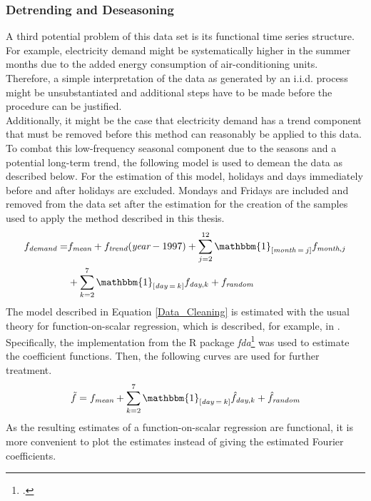 \documentclass[12pt, a4paper]{article}
\theoremstyle{MAstyle} \newtheorem{assumption}{Assumption}[section]
\theoremstyle{MAstyle} \newtheorem{definition}{Definition}[section]
\theoremstyle{MAstyle} \newtheorem{theorem}{Theorem}[section]
\begin{document}
			\subsubsection{Detrending and Deseasoning}
			A third potential problem of this data set is its functional time series structure. For example, electricity demand might be systematically higher in the summer months due to the added energy consumption of air-conditioning units. Therefore, a simple interpretation of the data as generated by an i.i.d. process might be unsubstantiated and additional steps have to be made before the procedure can be justified. \\
			Additionally, it might be the case that electricity demand has a trend component that must be removed before this method can reasonably be applied to this data. To combat this low-frequency seasonal component due to the seasons and a potential long-term trend, the following model is used to demean the data as described below. For the estimation of this model, holidays and days immediately before and after holidays are excluded. Mondays and Fridays are included and removed from the data set after the estimation for the creation of the samples used to apply the method described in this thesis.
			\begin{equation}\label{Data_Cleaning}
				\begin{split}
					f_{\textit{demand}} = &f_{\textit{mean}} + f_{\textit{trend}}(\textit{year} - 1997) + \sum_{j = 2}^{12}\mathbbm{1}_{\left[\textit{month}\: = \: j\right]}f_{\textit{month}, j}\\
					 &+ \sum_{k = 2}^{7}\mathbbm{1}_{\left[\textit{day}\: = \: k\right]}f_{\textit{day}, k} + f_{\textit{random}}
				\end{split}	
			\end{equation}
			The model described in Equation \ref{Data_Cleaning} is estimated with the usual theory for function-on-scalar regression, which is described, for example, in \cite{ramsay_functional_2005}. Specifically, the implementation from the R package \textit{fda}\footcite{fda} was used to estimate the coefficient functions. Then, the following curves are used for further treatment.
			\begin{equation}
				\tilde{f} = f_{\textit{mean}} + \sum_{k = 2}^{7}\mathbbm{1}_{\left[\textit{day}\: = \: k\right]}\hat{f}_{\textit{day}, k} + \hat{f}_{\textit{random}}
			\end{equation}
			As the resulting estimates of a function-on-scalar regression are functional, it is more convenient to plot the estimates instead of giving the estimated Fourier coefficients.			
\end{document}
